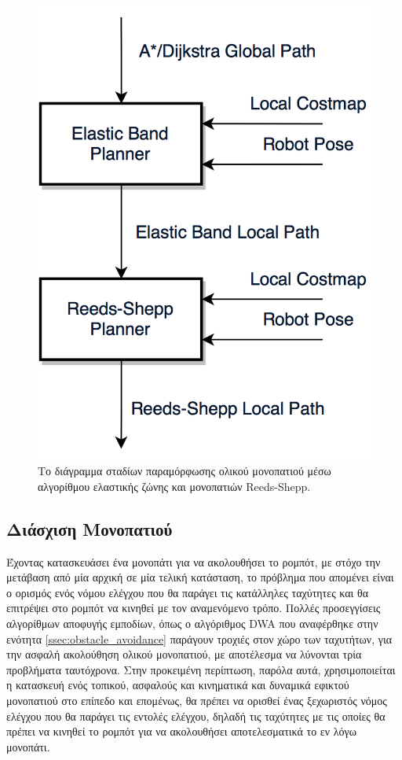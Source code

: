 \begin{figure}[!ht]
	\centering
	\includegraphics[width=0.35\linewidth]{Chapters/Chapter3/Figures/rsband_diagram.png}
	\caption{Το διάγραμμα σταδίων παραμόρφωσης ολικού μονοπατιού μέσω αλγορίθμου ελαστικής ζώνης και μονοπατιών Reeds-Shepp.}
	\label{fig:rsband_diagram}
\end{figure}


\subsection{Διάσχιση Μονοπατιού} \label{ssec:path_following}
Έχοντας κατασκευάσει ένα μονοπάτι για να ακολουθήσει το ρομπότ, με στόχο την μετάβαση από μία αρχική σε μία τελική κατάσταση, το πρόβλημα που απομένει είναι ο ορισμός ενός νόμου ελέγχου που θα παράγει τις κατάλληλες ταχύτητες και θα επιτρέψει στο ρομπότ να κινηθεί με τον αναμενόμενο τρόπο. Πολλές προσεγγίσεις αλγορίθμων αποφυγής εμποδίων, όπως ο αλγόριθμος DWA \cite{dwa} που αναφέρθηκε στην ενότητα \ref{ssec:obstacle_avoidance} παράγουν τροχιές στον χώρο των ταχυτήτων, για την ασφαλή ακολούθηση ολικού μονοπατιού, με αποτέλεσμα να λύνονται τρία προβλήματα ταυτόχρονα. Στην προκειμένη περίπτωση, παρόλα αυτά, χρησιμοποιείται η κατασκευή ενός τοπικού, ασφαλούς και κινηματικά και δυναμικά εφικτού μονοπατιού στο επίπεδο και επομένως, θα πρέπει να ορισθεί ένας ξεχωριστός νόμος ελέγχου που θα παράγει τις εντολές ελέγχου, δηλαδή τις ταχύτητες με τις οποίες θα πρέπει να κινηθεί το ρομπότ για να ακολουθήσει αποτελεσματικά το εν λόγω μονοπάτι.

